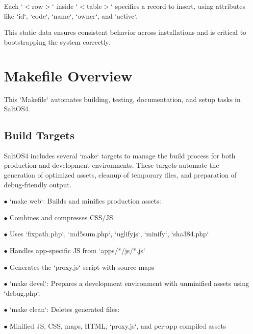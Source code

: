 \documentclass[a4paper]{article}
\begin{document}
Each `$<$row$>$` inside `$<$table$>$` specifies a record to insert, using attributes like `id`, `code`, `name`, `owner`, and `active`.

This static data ensures consistent behavior across installations and is critical to bootstrapping the system correctly.


\hypertarget{toc58}{}
\section{Makefile Overview}

This `Makefile` automates building, testing, documentation, and setup tasks in SaltOS4.

\hypertarget{toc59}{}
\subsection{Build Targets}

SaltOS4 includes several `make` targets to manage the build process for both production and development environments. These targets automate the generation of optimized assets, cleanup of temporary files, and preparation of debug-friendly output.

\begin{compactitem}
\item[\color{myblue}$\bullet$] `make web`: Builds and minifies production assets:
  \begin{compactitem}
  \item[\color{myblue}$\bullet$] Combines and compresses CSS/JS
  \item[\color{myblue}$\bullet$] Uses `fixpath.php`, `md5sum.php`, `uglifyjs`, `minify`, `sha384.php`
  \item[\color{myblue}$\bullet$] Handles app-specific JS from `apps/*/js/*.js`
  \item[\color{myblue}$\bullet$] Generates the `proxy.js` script with source maps
  \end{compactitem}
\item[\color{myblue}$\bullet$] `make devel`: Prepares a development environment with unminified assets using `debug.php`.
\item[\color{myblue}$\bullet$] `make clean`: Deletes generated files:
  \begin{compactitem}
  \item[\color{myblue}$\bullet$] Minified JS, CSS, maps, HTML, `proxy.js`, and per-app compiled assets
  \end{compactitem}
\end{compactitem}
\end{document}

